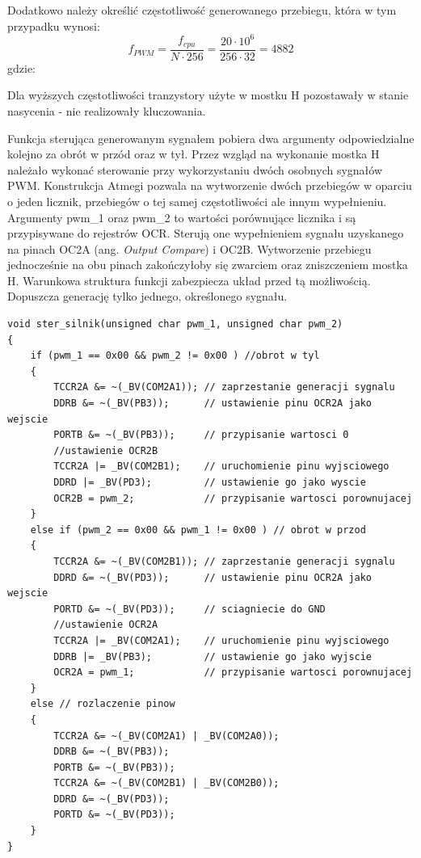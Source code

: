 \noindent
Dodatkowo należy określić częstotliwość generowanego przebiegu, która w tym przypadku wynosi:
\begin{equation}
	f_{PWM} =  \frac{f_{cpu}}{N \cdot 256} = \frac{20 \cdot 10^6}{256 \cdot 32} = 4882 
   \label{eq:czest_kola}
 \end{equation}
 gdzie:  
 \begin{equationDescriptor}
 \end{equationDescriptor}
\noindent
Dla wyższych częstotliwości tranzystory użyte w mostku H pozostawały w stanie nasycenia - nie realizowały kluczowania. 

Funkcja sterująca generowanym sygnałem pobiera dwa argumenty odpowiedzialne kolejno za obrót w przód oraz w tył. Przez wzgląd na wykonanie mostka H należało wykonać sterowanie przy wykorzystaniu dwóch osobnych sygnałów PWM. Konstrukcja Atmegi pozwala na wytworzenie dwóch przebiegów w oparciu o jeden licznik, przebiegów o tej samej częstotliwości ale innym wypełnieniu. Argumenty pwm\_1 oraz pwm\_2 to wartości porównujące licznika i są przypisywane do rejestrów OCR. Sterują one wypełnieniem sygnału uzyskanego na pinach OC2A (ang. \textit{Output Compare}) i OC2B. Wytworzenie przebiegu jednocześnie na obu pinach zakończyłoby się zwarciem oraz zniszczeniem mostka H. Warunkowa struktura funkcji zabezpiecza układ przed tą możliwością. Dopuszcza generację tylko jednego, określonego sygnału. 
\begin{lstlisting}[caption=Implementacja funkcji sterującej licznikiem Timer2]
void ster_silnik(unsigned char pwm_1, unsigned char pwm_2)
{
	if (pwm_1 == 0x00 && pwm_2 != 0x00 ) //obrot w tyl
	{
		TCCR2A &= ~(_BV(COM2A1)); // zaprzestanie generacji sygnalu
		DDRB &= ~(_BV(PB3)); 	  // ustawienie pinu OCR2A jako wejscie
		PORTB &= ~(_BV(PB3));     // przypisanie wartosci 0
		//ustawienie OCR2B
		TCCR2A |= _BV(COM2B1);    // uruchomienie pinu wyjsciowego
		DDRD |= _BV(PD3);         // ustawienie go jako wyscie
		OCR2B = pwm_2;            // przypisanie wartosci porownujacej
	}
	else if (pwm_2 == 0x00 && pwm_1 != 0x00 ) // obrot w przod
	{
		TCCR2A &= ~(_BV(COM2B1)); // zaprzestanie generacji sygnalu
		DDRD &= ~(_BV(PD3));      // ustawienie pinu OCR2A jako wejscie
		PORTD &= ~(_BV(PD3));     // sciagniecie do GND
		//ustawienie OCR2A
		TCCR2A |= _BV(COM2A1);    // uruchomienie pinu wyjsciowego
		DDRB |= _BV(PB3);         // ustawienie go jako wyjscie
		OCR2A = pwm_1;            // przypisanie wartosci porownujacej
	}
	else // rozlaczenie pinow
	{
		TCCR2A &= ~(_BV(COM2A1) | _BV(COM2A0)); 
		DDRB &= ~(_BV(PB3)); 
		PORTB &= ~(_BV(PB3)); 
		TCCR2A &= ~(_BV(COM2B1) | _BV(COM2B0)); 
		DDRD &= ~(_BV(PD3)); 
		PORTD &= ~(_BV(PD3)); 
	}
}
\end{lstlisting}

